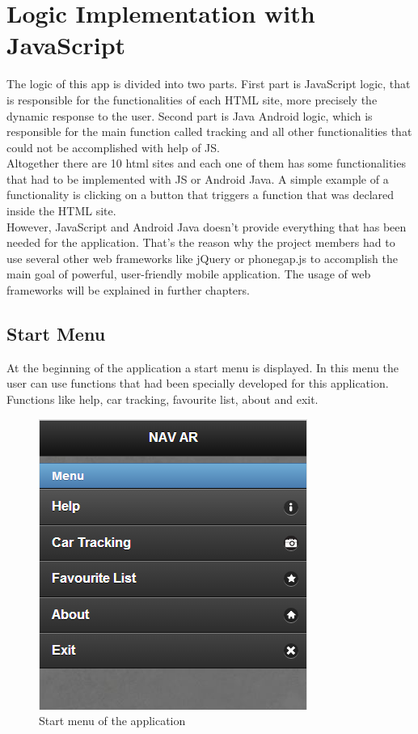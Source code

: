 \chapter{Logic Implementation with JavaScript} \label{chapter:desgin}

The logic of this app is divided into two parts. First part is JavaScript logic, that is responsible for the functionalities of each HTML site, more precisely the dynamic response to the user. Second part is Java Android logic, which is responsible for the main function called tracking and all other functionalities that could not be accomplished with help of JS. 
\\

Altogether there are 10 html sites and each one of them has some functionalities that had to be implemented with JS or Android Java. A simple example of a functionality is clicking on a button that triggers a function that was declared inside the HTML site.
\\

However, JavaScript and Android Java doesn’t provide everything that has been needed for the application. That’s the reason why the project members had to use several other web frameworks like jQuery or phonegap.js to accomplish the main goal of powerful, user-friendly mobile application. The usage of web frameworks will be explained in further chapters. 

\section{Start Menu}
At the beginning of the application a start menu is displayed. In this menu the user can use functions that had been specially developed for this application. Functions like help, car tracking, favourite list, about and exit.
\\

\begin{figure}
\centering
\includegraphics[width=0.6\linewidth]{graphics/chapter4/1}
\caption{Start menu of the application}
\label{fig:1}
\end{figure}
\newpage

